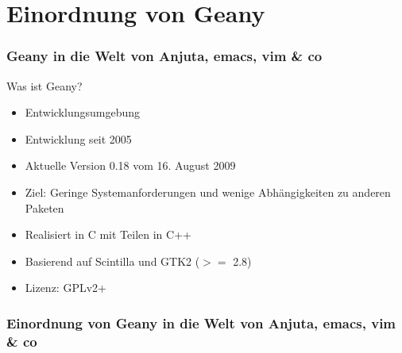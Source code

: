 \section{Einordnung von Geany}
\begin{frame}
	\frametitle{Geany in die Welt von Anjuta, emacs, vim \& co}
	\begin{block}{Was ist Geany?}
		\begin{itemize}
			\item Entwicklungsumgebung
			\item Entwicklung seit 2005
			\item Aktuelle Version 0.18 vom 16. August 2009
			\item Ziel: Geringe Systemanforderungen und wenige
				  Abhängigkeiten zu anderen Paketen
			\item Realisiert in C mit Teilen in C++
			\item Basierend auf Scintilla und GTK2 ($>=$ 2.8)
			\item Lizenz: GPLv2+
		\end{itemize}
	\end{block}
\end{frame}

\begin{frame}
	\frametitle{Einordnung von Geany in die Welt von Anjuta, emacs, vim \& co}
	\begin{figure}[ht]
		\centering
 		\footnotesize
		
	\end{figure}
\end{frame}
